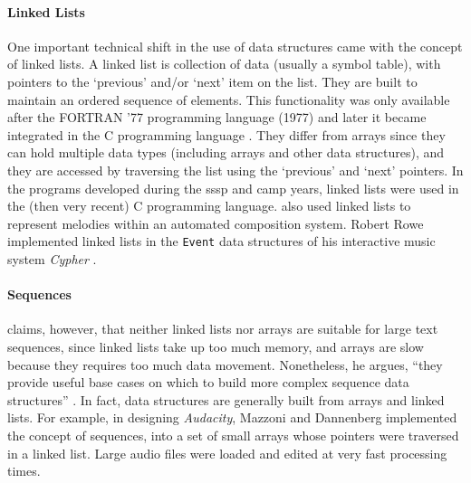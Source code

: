 \paragraph{Linked Lists}
\label{computer:linked}
One important technical shift in the use of data structures came with the concept of linked lists. A linked list is collection of data (usually a symbol table), with pointers to the `previous' and/or `next' item on the list. They are built to maintain an ordered sequence of elements. This functionality was only available after the FORTRAN '77 programming language (1977) and later it became integrated in the C programming language \parencite{kernighan_c_1978}. They differ from arrays since they can hold multiple data types (including arrays and other data structures), and they are accessed by traversing the list using the `previous' and `next' pointers. In the programs developed during the \gls{sssp} and \gls{camp} years, linked lists were used in the (then very recent) C programming language. \citeauthor{icmc/bbp2372.1985.040} \parencite{icmc/bbp2372.1985.040} also used linked lists to represent melodies within an automated composition system. Robert Rowe implemented linked lists in the \texttt{Event} data structures of his interactive music system \textit{Cypher} \parencite{Row92:Int}.

\paragraph{Sequences}
\label{computer:audacity}
\citeauthor{crowley98} claims, however, that neither linked lists nor arrays are suitable for large text sequences, since linked lists take up too much memory, and arrays are slow because they requires too much data movement. Nonetheless, he argues, ``they provide useful base cases on which to build more complex sequence data structures'' \parencite{crowley98}. In fact, data structures are generally built from arrays and linked lists. For example, in designing \textit{Audacity}, Mazzoni and Dannenberg \parencite{icmc/bbp2372.2001.051} implemented the concept of sequences, into a set of small arrays whose pointers were traversed in a linked list. Large audio files were loaded and edited at very fast processing times.

